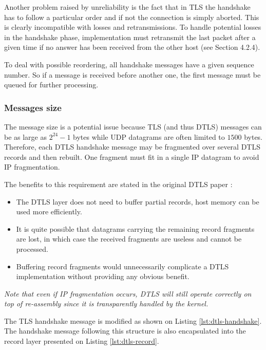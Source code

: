 Another problem raised by unreliability is the fact that in TLS the handshake has to follow a particular order and if not the connection is simply aborted. This is clearly incompatible with losses and retransmissions. To handle potential losses in the handshake phase, implementation must retransmit the last packet after a given time if no answer has been received from the other host (see \cite{rfc6347} Section 4.2.4).

To deal with possible reordering, all handshake messages have a given sequence number. So if a message is received before another one, the first message must be queued for further processing.

\subsubsection{Messages size}

The message size is a potential issue because TLS (and thus DTLS) messages can be as large as $2^{24}-1$ bytes while UDP datagrams are often limited to $1500$ bytes. Therefore, each DTLS handshake message may be fragmented over several DTLS records and then rebuilt. One fragment must fit in a single IP datagram to avoid IP fragmentation.

The benefits to this requirement are stated in the original DTLS paper \cite{modadugu2004design} :
\begin{itemize}
\item The DTLS layer does not need to buffer partial records, host memory can be used more efficiently.
\item It is quite possible that datagrams carrying the remaining record fragments are lost, in which case the received fragments are useless and cannot be processed.
\item Buffering record fragments would unnecessarily complicate a DTLS implementation without providing any obvious benefit.
\end{itemize}

\textit{Note that even if IP fragmentation occurs, DTLS will still operate correctly on top of re-assembly since it is transparently handled by the kernel.}

The TLS handshake message is modified as shown on Listing \ref{lst:dtls-handshake}. The handshake message following this structure is also encapsulated into the record layer presented on Listing \ref{lst:dtls-record}.

